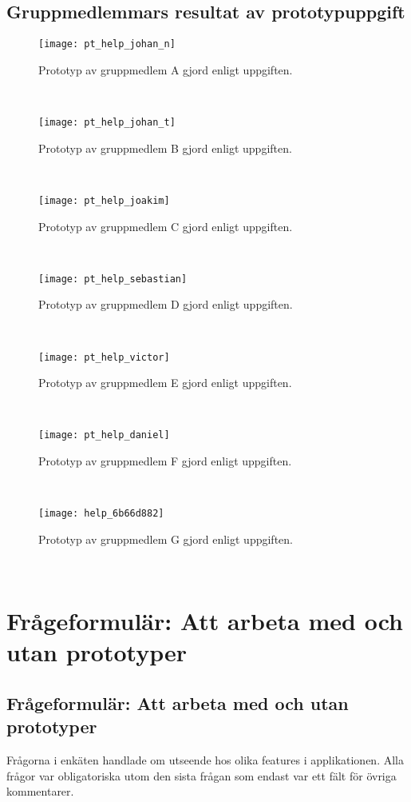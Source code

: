 \section{Gruppmedlemmars resultat av prototypuppgift}
\label{sec:gruppens_skisser}
\begin{figure}[!htb]
  \centering
  \texttt{[image: pt\_help\_johan\_n]}
  \caption{Prototyp av gruppmedlem A gjord enligt uppgiften.}
  \label{fig:pt_help_johan_n}
\end{figure}
\ 
\begin{figure}[H]
  \centering
  \texttt{[image: pt\_help\_johan\_t]}
  \caption{Prototyp av gruppmedlem B gjord enligt uppgiften.}
  \label{fig:pt_help_johan_t}
\end{figure}
\ 
\begin{figure}[H]
  \centering
  \texttt{[image: pt\_help\_joakim]}
  \caption{Prototyp av gruppmedlem C gjord enligt uppgiften.}
  \label{fig:pt_help_joakim}
\end{figure}
\ 
\begin{figure}[H]
  \centering
  \texttt{[image: pt\_help\_sebastian]}
  \caption{Prototyp av gruppmedlem D gjord enligt uppgiften.}
  \label{fig:pt_help_sebastian}
\end{figure}
\ 
\begin{figure}[H]
  \centering
  \texttt{[image: pt\_help\_victor]}
  \caption{Prototyp av gruppmedlem E gjord enligt uppgiften.}
  \label{fig:pt_help_victor}
\end{figure}
\ 
\begin{figure}[H]
  \centering
  \texttt{[image: pt\_help\_daniel]}
  \caption{Prototyp av gruppmedlem F gjord enligt uppgiften.}
  \label{fig:pt_help_daniel}
\end{figure}
\ 
\begin{figure}[H]
  \centering
  \texttt{[image: help\_6b66d882]}
  \caption{Prototyp av gruppmedlem G gjord enligt uppgiften.}
  \label{fig:pt_help_jonathan}
\end{figure}
\ 

\chapter{\hspace{2.6em} Frågeformulär: Att arbeta med och utan prototyper}
\label{cha:prototyper_enkat}
\section{Frågeformulär: Att arbeta med och utan prototyper}
\label{sec:prototyper_enkat}
Frågorna i enkäten handlade om utseende hos olika features i applikationen. Alla frågor var obligatoriska utom den sista frågan som endast var ett fält för övriga kommentarer.

